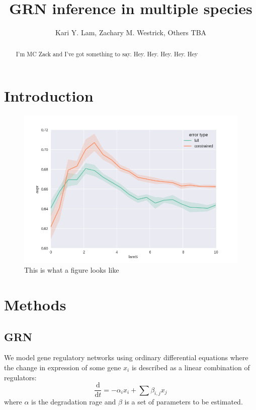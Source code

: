\documentclass[11pt]{article}
\begin{document}
\title{GRN inference in multiple species}
\author{Kari Y. Lam, Zachary M. Westrick, Others TBA}
\maketitle

\begin{abstract}
I'm MC Zack and I've got something to say. Hey. Hey. Hey. Hey. Hey
\end{abstract}

\section{Introduction}

\begin{figure}
\begin{center}
  \includegraphics[scale=0.45]{simulated.png}
  \caption{\label{fig:figure1} This is what a figure looks like}
  \end{center}
\end{figure}

\section{Methods}
\subsection{GRN}
We model gene regulatory networks using ordinary differential equations where the change in expression of some gene $x_{i}$ is described as a linear combination of regulators:
\begin{equation}
\frac{\mathrm d}{\mathrm d t} = -\alpha_{i}x_{i} + \sum \beta_{i,j}x_{j}
\end{equation}
where $\alpha$ is the degradation rage and $\beta$ is a set of parameters to be estimated.
\end{document}
